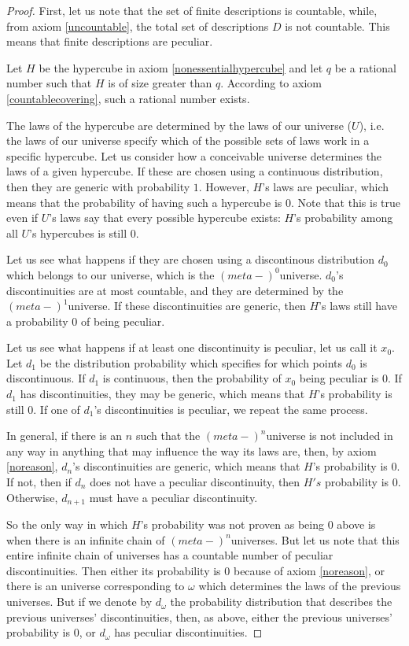 \documentclass[a4paper
,draft
]{article}
\def\infordinala{\omega}
\begin{document}
\begin{proof}

First, let us note that the set of finite descriptions is countable, while, from axiom \ref{uncountable}, the total set of descriptions $D$ is not countable. This means that finite descriptions are peculiar.

Let $H$ be the hypercube in axiom \ref{nonessentialhypercube} and let $q$ be a rational number such that $H$ is of size greater than $q$. According to axiom \ref{countablecovering}, such a rational number exists.

The laws of the hypercube are determined by the laws of our universe ($U$), i.e. the laws of our universe specify which of the possible sets of laws work in a specific hypercube. Let us consider how a conceivable universe determines the laws of a given hypercube. If these are chosen using a continuous distribution, then they are generic with probability $1$. However, $H$'s laws are peculiar, which means that the probability of having such a hypercube is $0$. Note that this is true even if $U$'s laws say that every possible hypercube exists: $H$'s probability among all $U$'s hypercubes is still $0$.

Let us see what happens if they are chosen using a discontinous distribution $d_0$ which belongs to our universe, which is the $(meta-)^0$universe. $d_0$'s discontinuities are at most countable, and they are determined by the $(meta-)^1$universe. If these discontinuities are generic, then $H$'s laws still have a probability $0$ of being peculiar.

Let us see what happens if at least one discontinuity is peculiar, let us call it $x_0$. Let $d_1$ be the distribution probability which specifies for which points $d_0$ is discontinuous. If $d_1$ is continuous, then the probability of $x_0$ being peculiar is $0$. If $d_1$ has discontinuities, they may be generic, which means that $H$'s probability is still $0$. If one of $d_1$'s discontinuities is peculiar, we repeat the same process.

In general, if there is an $n$ such that the $(meta-)^{n}$universe is not included in any way in anything that may influence the way its laws are, then, by axiom \ref{noreason}, $d_n$'s discontinuities are generic, which means that $H$'s probability is $0$. If not, then if $d_n$ does not have a peculiar discontinuity, then $H's$ probability is $0$. Otherwise, $d_{n+1}$ must have a peculiar discontinuity.

So the only way in which $H$'s probability was not proven as being $0$ above is when there is an infinite chain of $(meta-)^{n}$universes. But let us note that this entire infinite chain of universes has a countable number of peculiar discontinuities. Then either its probability is $0$ because of axiom \ref{noreason}, or there is an universe corresponding to $\infordinala$ which determines the laws of the previous universes. But if we denote by $d_{\infordinala}$ the probability distribution that describes the previous universes' discontinuities, then, as above, either the previous universes' probability is 0, or $d_{\infordinala}$ has peculiar discontinuities.


\end{proof}
\end{document}
